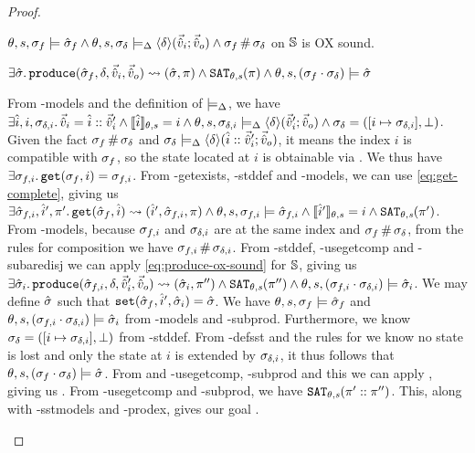 \begin{proof}

\pfassume \begin{hypvlist}
 $\theta, s, \sigma_f \models \hat{\sigma}_f \land \theta, s, \sigma_\delta \models_{\Delta} \left<\delta\right>\!(\vec{\hat{v}}_i;\vec{\hat{v}}_o) \land \sigma_f\operatorname{\#}\sigma_\delta$ 
 \produce{} on $\mathbb S$ is OX sound.
\end{hypvlist}
\pfprove \begin{goalvlist}
 $\exists \hat{\sigma}\ldotp \texttt{produce}(\hat{\sigma}_f,\delta,\vec{\hat{v}}_i,\vec{\hat{v}}_o)\rightsquigarrow (\hat{\sigma},\pi) \land \texttt{SAT}_{\mathit{\theta,s}}(\pi) \land \theta,s,(\sigma_f\cdot\sigma_\delta) \models \hat{\sigma}$
\end{goalvlist}

\pfcase{$\delta \in \preds_\mmdl$}

\begin{hypvlist}
 From \hyp{models} and the definition of $\models_{\Delta}$, we have $\exists \hat{i},i,\sigma_{\delta,i} \ldotp \vec{\hat{v}}_i=\hat{i}::\vec{\hat{v}}_i' \land \llbracket\hat{i}\rrbracket_{\theta,s}=i \land \theta,s,\sigma_{\delta,i}\models_{\Delta} \left<\delta\right>\!(\vec{\hat{v}}_i';\vec{\hat{v}}_o) \land \sigma_\delta=([i\mapsto \sigma_{\delta,i}],\bot)$.
 Given the fact $\sigma_f\operatorname{\#}\sigma_\delta$ and $\sigma_\delta\models_{\Delta}\left<\delta\right>\!(\hat{i}::\vec{\hat{v}}_i';\vec{\hat{v}}_o)$, it means the index $i$ is compatible with $\sigma_f$, so the state located at $i$ is obtainable via . We thus have $\exists \sigma_{f,i} \ldotp {\ensuremath{\texttt{get}(\sigma_f,i)=\sigma_{f,i}}}$.
 From \hyp{getexists}, \hyp{stddef} and \hyp{models}, we can use \ref{eq:get-complete}, giving us $\exists \hat{\sigma}_{f,i},\hat{i}', \pi'\ldotp \texttt{get}(\hat{\sigma}_f,\hat{i})\rightsquigarrow(\hat{i}',\hat{\sigma}_{f,i},\pi) \land \theta,s,\sigma_{f,i}\models\hat{\sigma}_{f,i} \land \llbracket\hat{i}'\rrbracket_{\theta,s}=i \land \texttt{SAT}_{\mathit{\theta,s}}(\pi')$.
 From \hyp{models}, because $\sigma_{f,i}$ and $\sigma_{\delta,i}$ are at the same index and $\sigma_f\operatorname{\#}\sigma_\delta$, from the rules for composition we have $\sigma_{f,i}\operatorname{\#}\sigma_{\delta,i}$.
 From \hyp{stddef}, \hyp{usegetcomp} and \hyp{subaredisj} we can apply \ref{eq:produce-ox-sound} for $\mathbb S$, giving us $\exists \hat{\sigma}_i\ldotp {\ensuremath{\texttt{produce}(\hat{\sigma}_{f,i},\delta,\vec{\hat{v}}_i',\vec{\hat{v}}_o)\rightsquigarrow (\hat{\sigma}_i,\pi'')}}\land\texttt{SAT}_{\mathit{\theta,s}}(\pi'')\land \theta,s,(\sigma_{f,i}\cdot\sigma_{\delta,i})\models\hat{\sigma}_i$.
 We may define $\hat{\sigma}$ such that $\texttt{set}(\hat{\sigma}_f,\hat{i}',\hat{\sigma}_i)=\hat{\sigma}$.
 We have $\theta, s, \sigma_f \models \hat{\sigma}_f$ and ${\theta,s,(\sigma_{f,i}\cdot\sigma_{\delta,i})\models\hat{\sigma}_i}$ from \hyp{models} and \hyp{subprod}. Furthermore, we know $\sigma_\delta=([i\mapsto \sigma_{\delta,i}],\bot)$ from \hyp{stddef}. From \hyp{defsst} and the rules for  we know no state is lost and only the state at $i$ is extended by $\sigma_{\delta,i}$, it thus follows that $\theta,s,(\sigma_f\cdot\sigma_\delta)\models\hat{\sigma}$.%
 From and \hyp{usegetcomp}, \hyp{subprod} and this we can apply , giving us .
 From \hyp{usegetcomp} and \hyp{subprod}, we have $\texttt{SAT}_{\mathit{\theta,s}}(\pi'::\pi'')$. This, along with \hyp{sstmodels} and \hyp{prodex}, gives our goal .
\end{hypvlist}


\end{proof}
